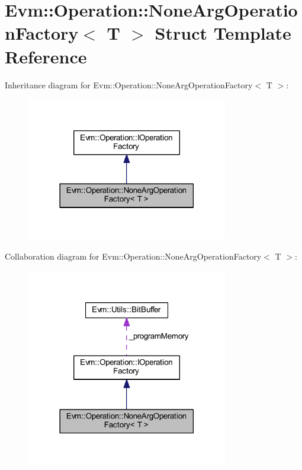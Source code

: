 \hypertarget{struct_evm_1_1_operation_1_1_none_arg_operation_factory}{}\section{Evm\+:\+:Operation\+:\+:None\+Arg\+Operation\+Factory$<$ T $>$ Struct Template Reference}
\label{struct_evm_1_1_operation_1_1_none_arg_operation_factory}


Inheritance diagram for Evm\+:\+:Operation\+:\+:None\+Arg\+Operation\+Factory$<$ T $>$\+:
\nopagebreak
\begin{figure}[H]
\begin{center}
\leavevmode
\includegraphics[width=249pt]{struct_evm_1_1_operation_1_1_none_arg_operation_factory__inherit__graph}
\end{center}
\end{figure}


Collaboration diagram for Evm\+:\+:Operation\+:\+:None\+Arg\+Operation\+Factory$<$ T $>$\+:
\nopagebreak
\begin{figure}[H]
\begin{center}
\leavevmode
\includegraphics[width=249pt]{struct_evm_1_1_operation_1_1_none_arg_operation_factory__coll__graph}
\end{center}
\end{figure}
